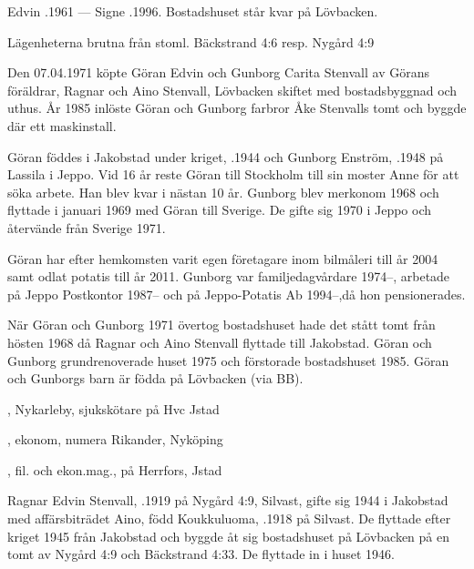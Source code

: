 Edvin .1961  ---  Signe .1996. Bostadshuset står kvar på Lövbacken.




Lägenheterna brutna från stoml. Bäckstrand 4:6 resp. Nygård 4:9



Den 07.04.1971 köpte Göran Edvin och Gunborg Carita Stenvall av Görans föräldrar, Ragnar och Aino Stenvall,  Lövbacken skiftet med bostadsbyggnad och uthus. År 1985 inlöste Göran och Gunborg farbror Åke Stenvalls tomt och byggde där ett maskinstall.

Göran föddes i Jakobstad under kriget, .1944 och Gunborg Enström, .1948 på Lassila i Jeppo. Vid 16 år reste Göran till Stockholm till sin moster Anne för att söka arbete. Han blev kvar i nästan 10 år. Gunborg blev merkonom 1968 och flyttade i januari 1969 med Göran till Sverige. De gifte sig 1970 i Jeppo och återvände från Sverige 1971.

Göran har efter hemkomsten varit egen företagare inom bilmåleri till år 2004 samt odlat potatis till år 2011. Gunborg var familjedagvårdare 1974--, arbetade på Jeppo Postkontor 1987-- och på Jeppo-Potatis Ab 1994--,då hon pensionerades.

När Göran och Gunborg 1971 övertog bostadshuset hade det stått tomt från hösten 1968 då Ragnar och Aino Stenvall flyttade till Jakobstad. Göran och Gunborg grundrenoverade huset 1975 och förstorade bostadshuset 1985.
Göran och Gunborgs barn är födda på Lövbacken (via BB).
\begin{jhchildren}
  \item {}, Nykarleby, sjukskötare på Hvc Jstad
  \item {}, ekonom, numera Rikander, Nyköping
  \item {}, fil. och ekon.mag., på Herrfors, Jstad
\end{jhchildren}


Ragnar Edvin Stenvall, .1919 på Nygård 4:9, Silvast, gifte sig 1944 i Jakobstad med affärsbiträdet Aino, född Koukkuluoma, .1918 på Silvast. De flyttade efter kriget 1945 från Jakobstad	och byggde åt sig bostadshuset på Lövbacken på en tomt av Nygård 4:9 och Bäckstrand 4:33. De flyttade in i huset 1946.


